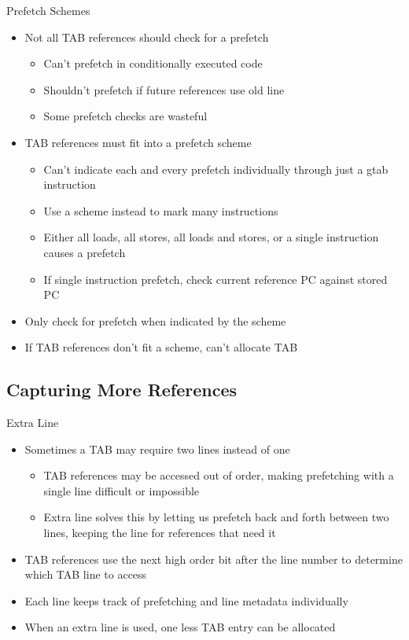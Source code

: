 \documentclass{beamer}
\begin{document}
\begin{frame}{Prefetch Schemes}
   \begin{itemize}
      \item Not all TAB references should check for a prefetch
         \begin{itemize}
            \item Can't prefetch in conditionally executed code
            \item Shouldn't prefetch if future references use old line
            \item Some prefetch checks are wasteful
         \end{itemize}
      \item TAB references must fit into a prefetch scheme
         \begin{itemize}
            \item Can't indicate each and every prefetch individually through 
               just a gtab instruction
            \item Use a scheme instead to mark many instructions
            \item Either all loads, all stores, all loads and stores, or a single
               instruction causes a prefetch
            \item If single instruction prefetch, check current reference PC against
               stored PC
         \end{itemize}
      \item Only check for prefetch when indicated by the scheme
      \item If TAB references don't fit a scheme, can't allocate TAB
   \end{itemize}
\end{frame}
\subsection{Capturing More References}
\begin{frame}{Extra Line}
   \begin{itemize}
      \item Sometimes a TAB may require two lines instead of one
         \begin{itemize}
            \item TAB references may be accessed out of order, making 
               prefetching with a single line difficult or impossible
            \item Extra line solves this by letting us prefetch back and forth
               between two lines, keeping the line for references that need it
         \end{itemize}
      \item TAB references use the next high order bit after the line number
         to determine which TAB line to access
      \item Each line keeps track of prefetching and line metadata individually
      \item When an extra line is used, one less TAB entry can be allocated
   \end{itemize}
\end{frame}
\end{document}
